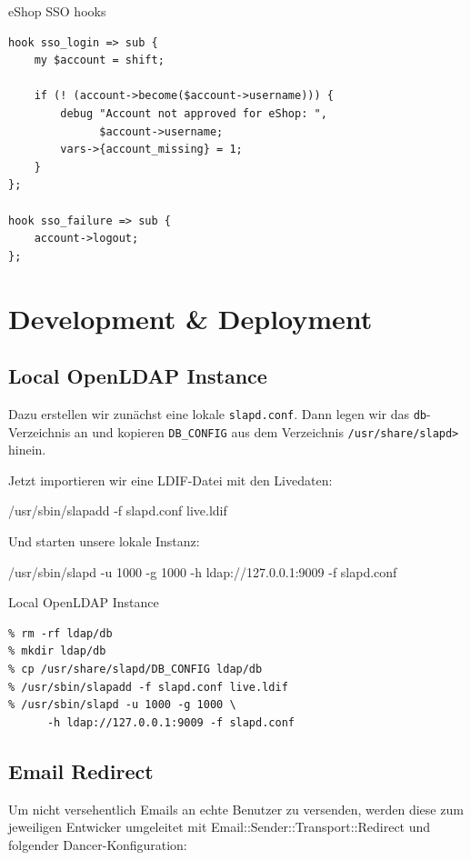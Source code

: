 \begin{frame}[fragile]{eShop SSO hooks}
\begin{lstlisting}
hook sso_login => sub {
    my $account = shift;

    if (! (account->become($account->username))) {
        debug "Account not approved for eShop: ", 
              $account->username;
        vars->{account_missing} = 1;
    }
};

hook sso_failure => sub {
    account->logout;
};
\end{lstlisting}
\end{frame}

\section{Development \& Deployment}

\subsection{Local OpenLDAP Instance}

Dazu erstellen wir zunächst eine lokale \verb|slapd.conf|. Dann legen
wir das \verb|db|-Verzeichnis an und kopieren \verb|DB_CONFIG| aus dem
Verzeichnis \verb|/usr/share/slapd>| hinein.

Jetzt importieren wir eine LDIF-Datei mit den Livedaten:

    /usr/sbin/slapadd -f slapd.conf live.ldif

Und starten unsere lokale Instanz:

    /usr/sbin/slapd -u 1000 -g 1000 -h ldap://127.0.0.1:9009 -f slapd.conf

\begin{frame}[fragile]{Local OpenLDAP Instance}
\begin{lstlisting}
% rm -rf ldap/db
% mkdir ldap/db
% cp /usr/share/slapd/DB_CONFIG ldap/db
% /usr/sbin/slapadd -f slapd.conf live.ldif
% /usr/sbin/slapd -u 1000 -g 1000 \
      -h ldap://127.0.0.1:9009 -f slapd.conf
\end{lstlisting}
\end{frame}

\subsection{Email Redirect}

Um nicht versehentlich Emails an echte Benutzer zu versenden,
werden diese zum jeweiligen Entwicker umgeleitet mit
Email::Sender::Transport::Redirect und folgender
Dancer-Konfiguration:


